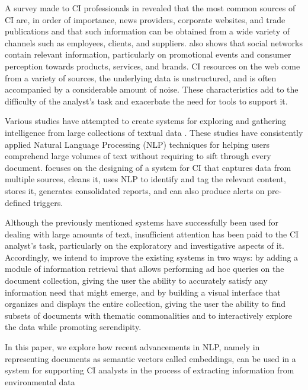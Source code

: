 \documentclass[a4paper]{article}
\begin{document}
A survey made to CI professionals in \citet{marin2004} revealed that the most common sources of CI are, in order of importance, news providers, corporate websites, and trade publications and that such information can be obtained from a wide variety of channels such as employees, clients, and suppliers. \citet{dey2011} also shows that social networks contain relevant information, particularly on promotional events and consumer perception towards products, services, and brands. CI resources on the web come from a variety of sources, the underlying data is unstructured, and is often accompanied by a considerable amount of noise. These characteristics add to the difficulty of the analyst's task and exacerbate the need for tools to support it.

Various studies have attempted to create systems for exploring and gathering intelligence from large collections of textual data \citep{ji2019, lafia2019, lafia2021a, dey2011}. These studies have consistently applied Natural Language Processing (NLP) techniques for helping users comprehend large volumes of text without requiring to sift through every document. \citet{dey2011} focuses on the designing of a system for CI that captures data from multiple sources, cleans it, uses NLP to identify and tag the relevant content, stores it, generates consolidated reports, and can also produce alerts on pre-defined triggers. 

Although the previously mentioned systems have successfully been used for dealing with large amounts of text, insufficient attention has been paid to the CI analyst's task, particularly on the exploratory and investigative aspects of it. Accordingly, we intend to improve the existing systems in two ways: by adding a module of information retrieval that allows performing ad hoc queries on the document collection, giving the user the ability to accurately satisfy any information need that might emerge, and by building a visual interface that organizes and displays the entire collection, giving the user the ability to find subsets of documents with thematic commonalities and to interactively explore the data while promoting serendipity.

In this paper, we explore how recent advancements in NLP, namely in representing documents as semantic vectors called embeddings, can be used in a system for supporting CI analysts in the process of extracting information from environmental data
\end{document}
